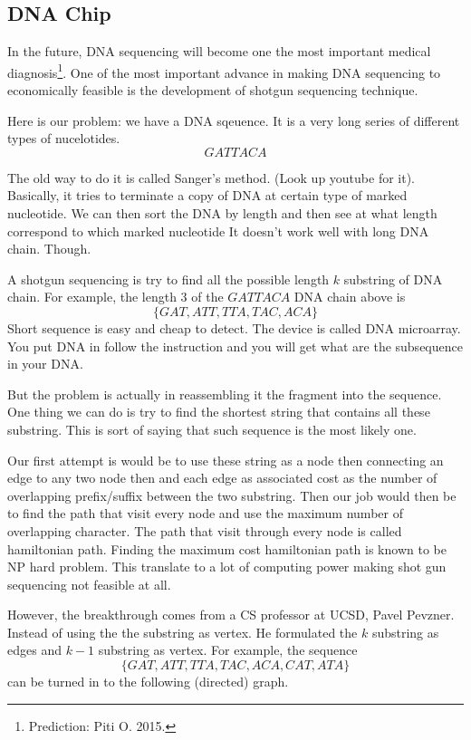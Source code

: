 \documentclass[a4paper, 12pt]{article}
\begin{document}
	\subsection*{DNA Chip}
	
	In the future, DNA sequencing will become one the most important medical diagnosis\footnote{Prediction: Piti O. 2015.}. One of the most important advance in making DNA sequencing to economically feasible is the development of shotgun sequencing technique.

	Here is our problem: we have a DNA sqeuence. It is a very long series of different types of nucelotides.
	\[
		GATTACA
	\]
	
	The old way to do it is called Sanger's method. (Look up youtube for it). Basically, it tries to terminate a copy of DNA at certain type of marked nucleotide. We can then sort the DNA by length and then see at what length correspond to which marked nucleotide It doesn't work well with long DNA chain. Though.
	
	A shotgun sequencing is try to find all the possible length $k$ substring of DNA chain. For example, the length $3$ of the $GATTACA$ DNA chain above is
	\[
		\{ GAT, ATT, TTA, TAC, ACA\}
	\]
	Short sequence is easy and cheap to detect. The device is called DNA microarray. You put DNA in follow the instruction and you will get what are the subsequence in your DNA.
	
	But the problem is actually in reassembling it the fragment into the sequence. One thing we can do is try to find the shortest string that contains all these substring. This is sort of saying that such sequence is the most likely one.
	
	Our first attempt is would be to use these string as a node then connecting an edge to any two node then and each edge as associated cost as the number of overlapping prefix/suffix between the two substring. Then our job would then be to find the path that visit every node and use the maximum number of overlapping character. The path that visit through every node is called hamiltonian path. Finding the maximum cost hamiltonian path is known to be NP hard problem. This translate to a lot of computing power making shot gun sequencing not feasible at all.
	
	However, the breakthrough comes from a CS professor at UCSD, Pavel Pevzner. Instead of using the the substring as vertex. He formulated the $k$ substring as edges and $k-1$ substring as vertex. For example, the sequence
	\[
		\{ GAT, ATT, TTA, TAC, ACA, CAT, ATA\}
	\]
	can be turned in to the following (directed) graph.
	
\end{document}
